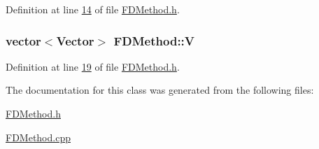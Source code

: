 Definition at line \hyperlink{FDMethod_8h_source_l00014}{14} of file \hyperlink{FDMethod_8h_source}{F\+D\+Method.\+h}.

\hypertarget{classFDMethod_a627ca1e8a18af23dbbe44a43cbc2831e}{
\subsubsection[{V}]{\setlength{\rightskip}{0pt plus 5cm}vector$<${\bf Vector}$>$ F\+D\+Method\+::\+V}}\label{classFDMethod_a627ca1e8a18af23dbbe44a43cbc2831e}


Definition at line \hyperlink{FDMethod_8h_source_l00019}{19} of file \hyperlink{FDMethod_8h_source}{F\+D\+Method.\+h}.



The documentation for this class was generated from the following files\+:\begin{DoxyCompactItemize}
\item 
\hyperlink{FDMethod_8h}{F\+D\+Method.\+h}\item 
\hyperlink{FDMethod_8cpp}{F\+D\+Method.\+cpp}\end{DoxyCompactItemize}
